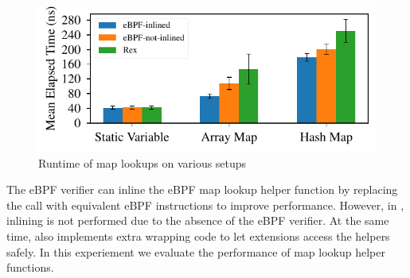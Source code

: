 \begin{figure}[t]
    \includegraphics[width=1.0\linewidth]{figs/inline.pdf}
    \centering
    \vspace{-25pt}
    \caption{Runtime of map lookups on various setups}
    \label{fig:eval-inline}
    \vspace{-12pt}
\end{figure}

The eBPF verifier can inline the eBPF map lookup
    helper function by replacing the call with equivalent eBPF instructions to
    improve performance.
However, in \projname{}, inlining is not performed due to the absence of the
    eBPF verifier. %
At the same time, \projname{} also implements extra wrapping code to let
    extensions access the helpers safely.
In this experiement we evaluate the performance of map lookup helper functions.

